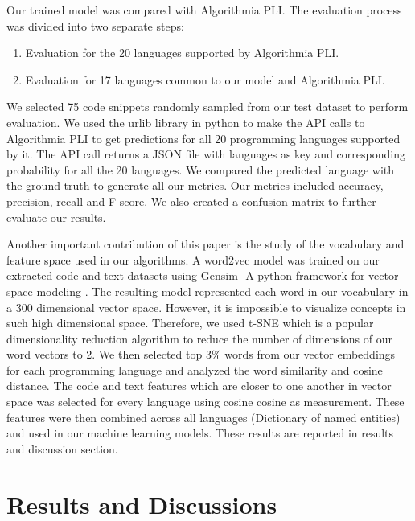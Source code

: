 \documentclass[letterpaper, 10 pt, conference]{ieeeconf}  %
\begin{document}
Our trained model was compared with Algorithmia PLI. The evaluation process was divided into two separate steps:
\begin{enumerate}
\item
Evaluation for the 20 languages supported by Algorithmia PLI.
\item Evaluation for 17 languages common to our model and Algorithmia PLI.
\end{enumerate}
We selected 75 code snippets randomly sampled from our test dataset to perform evaluation. We used the urlib library in python to make the API calls to Algorithmia PLI to get predictions for all 20 programming languages supported by it. The API call returns a JSON file with languages as key and corresponding probability for all the 20 languages. We compared the predicted language with the ground truth to generate all our metrics. Our metrics included accuracy, precision, recall and F score. We also created a confusion matrix to further evaluate our results. 
 
Another important contribution of this paper is the study of the vocabulary and feature space used in our algorithms. A word2vec model \cite{c20} was trained on our extracted code and text datasets using Gensim- A python framework for vector space modeling \cite{c19}. The resulting model represented each word in our vocabulary in a 300 dimensional vector space. However, it is impossible to visualize concepts in such high dimensional space. Therefore, we used t-SNE \cite{c21} which is a popular dimensionality reduction algorithm to reduce the number of dimensions of our word vectors to 2. We then selected top 3\% words from our vector embeddings for each programming language and analyzed the word similarity and cosine distance. The code and text features which are closer to one another in vector space was selected for every language using cosine cosine as measurement. These features were then combined across all languages (Dictionary of named entities) and used in our machine learning models. These results are reported in results and discussion section.

\section{Results and Discussions}
\bigbreak
\end{document}
